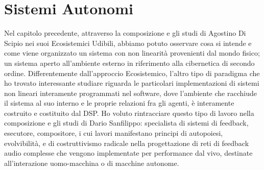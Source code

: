 \section{Sistemi Autonomi}
\label{sec:Sistemi Autonomi}

Nel capitolo precedente, attraverso la composizione e gli studi di Agostino Di Scipio 
nei suoi Ecosistemici Udibili, abbiamo potuto osservare
cosa si intende e come viene organizzato un sistema con non linearità provenienti dal 
mondo fisico; un sistema aperto all'ambiente esterno in riferimento 
alla cibernetica di secondo ordine.
Differentemente dall'approccio Ecosistemico, l'altro tipo di paradigma che ho trovato 
interessante studiare riguarda le particolari implementazioni di sistemi non lineari 
interamente programmati nel software, dove l'ambiente che racchiude il sistema al suo
interno e le proprie relazioni fra gli agenti, è interamente 
costruito e costituito dal DSP.
Ho voluto rintracciare questo tipo di lavoro nella composizione e gli studi
di Dario Sanfilippo: specialista di sistemi di feedback, esecutore, compositore,
i cui lavori manifestano principi di autopoiesi, evolvibilità, e di costruttivismo radicale 
nella progettazione di reti di feedback audio complesse 
che vengono implementate per performance dal vivo, destinate all'interazione 
uomo-macchina o di macchine autonome.

